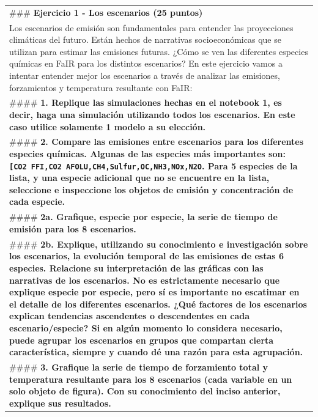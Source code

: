 \documentclass[11pt]{article}
\begin{document}
\begin{longtable}[]{@{}
  >{\raggedright\arraybackslash}p{}@{}}
\toprule
\endhead
\#\#\# \textbf{ Ejercicio 1 - Los escenarios (25 puntos) } \\
Los escenarios de emisión son fundamentales para entender las
proyecciones climáticas del futuro. Están hechos de narrativas
socioeconómicas que se utilizan para estimar las emisiones futuras.
¿Cómo se ven las diferentes especies químicas en FaIR para los distintos
escenarios? En este ejercicio vamos a intentar entender mejor los
escenarios a través de analizar las emisiones, forzamientos y
temperatura resultante con FaIR: \\
\#\#\#\# \textbf{ 1. Replique las simulaciones hechas en el notebook 1,
es decir, haga una simulación utilizando todos los escenarios. En este
caso utilice solamente 1 modelo a su elección. } \\
\#\#\#\# \textbf{ 2. Compare las emisiones entre escenarios para los
diferentes especies químicas. Algunas de las especies más importantes
son:
\texttt{{[}\textquotesingle{}CO2\ FFI\textquotesingle{},\textquotesingle{}CO2\ AFOLU\textquotesingle{},\textquotesingle{}CH4\textquotesingle{},\textquotesingle{}Sulfur\textquotesingle{},\textquotesingle{}OC\textquotesingle{},\textquotesingle{}NH3\textquotesingle{},\textquotesingle{}NOx\textquotesingle{},\textquotesingle{}N2O\textquotesingle{}{]}}.
Para 5 especies de la lista, y una especie adicional que no se encuentre
en la lista, seleccione e inspeccione los objetos de emisión y
concentración de cada especie. } \\
\#\#\#\# \textbf{ 2a. Grafique, especie por especie, la serie de tiempo
de emisión para los 8 escenarios. } \\
\#\#\#\# \textbf{ 2b. Explique, utilizando su conocimiento e
investigación sobre los escenarios, la evolución temporal de las
emisiones de estas 6 especies. Relacione su interpretación de las
gráficas con las narrativas de los escenarios. No es estrictamente
necesario que explique especie por especie, pero sí es importante no
escatimar en el detalle de los diferentes escenarios. ¿Qué factores de
los escenarios explican tendencias ascendentes o descendentes en cada
escenario/especie? Si en algún momento lo considera necesario, puede
agrupar los escenarios en grupos que compartan cierta característica,
siempre y cuando dé una razón para esta agrupación. } \\
\#\#\#\# \textbf{ 3. Grafique la serie de tiempo de forzamiento total y
temperatura resultante para los 8 escenarios (cada variable en un solo
objeto de figura). Con su conocimiento del inciso anterior, explique sus
resultados. } \\
\bottomrule
\end{longtable}
\end{document}
